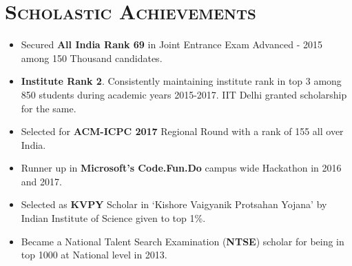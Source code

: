 \documentclass{article}
\newcommand{\tmpsection}[1]{}
\let\tmpsection=\section
\renewcommand{\section}[1]{\tmpsection*{\textsc{#1}}}
\begin{document}
\section{Scholastic Achievements}
\begin{itemize}
    \setlength\itemsep{0.0em}
    \item Secured \textbf{All India Rank 69} in Joint Entrance Exam Advanced - 2015 among 150 Thousand candidates.
    \item \textbf{Institute Rank 2}. Consistently maintaining institute rank in top 3 among 850 students during academic years 2015-2017. IIT Delhi granted scholarship for the same.
    \item Selected for \textbf{ACM-ICPC 2017} Regional Round with a rank of 155 all over India.
    \item Runner up in \textbf{Microsoft's Code.Fun.Do} campus wide Hackathon in 2016 and 2017.
    \item Selected as \textbf{KVPY} Scholar in `Kishore Vaigyanik Protsahan Yojana' by Indian Institute of Science given to top 1\%.
    \item Became a National Talent Search Examination (\textbf{NTSE}) scholar for being in top 1000 at National level in 2013.
\end{itemize}
\end{document}
